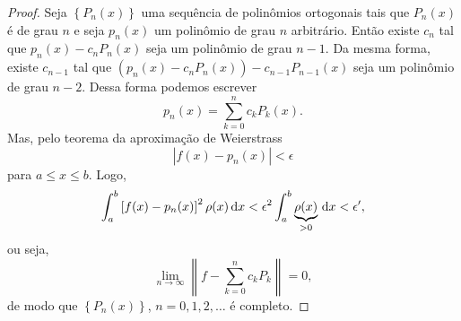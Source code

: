 \begin{proof}
  Seja $\left\{ P_n(x) \right\}$ uma sequência de polinômios ortogonais tais que
  $P_n(x)$ é de grau $n$ e seja $p_n(x)$ um polinômio de grau $n$ arbitrário.
  Então existe $c_n$ tal que $p_n(x) - c_n P_n(x)$ seja um polinômio de grau $n
  - 1$. Da mesma forma, existe $c_{n - 1}$ tal que $\left( p_n(x) - c_n P_n(x)
  \right) - c_{n - 1} P_{n - 1}(x)$ seja um polinômio de grau $n - 2$. Dessa
  forma podemos escrever
  \begin{dmath*}
    p_n(x) = \sum_{k = 0}^n c_k P_k(x).
  \end{dmath*}
  Mas, pelo teorema da aproximação de Weierstrass
  \begin{dmath*}
    \left| f(x) - p_n(x) \right| < \epsilon
  \end{dmath*}
  para $a \leq x \leq b$. Logo,
  \begin{dmath*}
    \int_a^b \left[ f(x) - p_n(x) \right]^2 \rho(x) \id{x} < \epsilon^2 \int_a^b
    \underbrace{\rho(x)}_{>0} \id{x} < \epsilon',
  \end{dmath*}
  ou seja,
  \begin{dmath*}
    \lim_{n \to \infty} \left\| f - \sum_{k = 0}^n c_k P_k \right\| = 0,
  \end{dmath*}
  de modo que $\left\{ P_n(x) \right\}$, $n = 0, 1, 2, \ldots$ é completo.
\end{proof}

